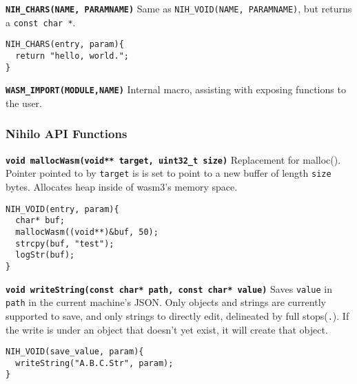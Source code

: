 \documentclass{article}
\begin{document}
\textbf{\texttt{NIH\_CHARS(NAME, PARAMNAME)}}\newline
Same as \texttt{NIH\_VOID(NAME, PARAMNAME)}, but returns a \texttt{const char *}.

\begin{tcolorbox}[colback=white,grow to left by=2.5mm,grow to right by=2.5mm,left*=0mm,right*=0mm,sharp corners]
\begin{verbatim}
NIH_CHARS(entry, param){
  return "hello, world.";
}
\end{verbatim}
\end{tcolorbox}

\textbf{\texttt{WASM\_IMPORT(MODULE,NAME)}}\newline
Internal macro, assisting with exposing functions to the user.

\subsubsection{Nihilo API Functions}

\textbf{\texttt{void mallocWasm(void** target, uint32\_t size)}}\newline
Replacement for malloc(). Pointer pointed to by \texttt{target} is is set to point to a new buffer of length \texttt{size} bytes. Allocates heap inside of wasm3's memory space.

\begin{tcolorbox}[colback=white,grow to left by=2.5mm,grow to right by=2.5mm,left*=0mm,right*=0mm,sharp corners]
\begin{verbatim}
NIH_VOID(entry, param){
  char* buf;
  mallocWasm((void**)&buf, 50);
  strcpy(buf, "test");
  logStr(buf);
}
\end{verbatim}
\end{tcolorbox}

\textbf{\texttt{void writeString(const char* path, const char* value)}}\newline
Saves \texttt{value} in \texttt{path} in the current machine's JSON. Only objects and strings are currently supported to save, and only strings to directly edit, delineated by full stops(\texttt{.}). If the write is under an object that doesn't yet exist, it will create that object.

\begin{tcolorbox}[colback=white,grow to left by=2.5mm,grow to right by=2.5mm,left*=0mm,right*=0mm,sharp corners]
\begin{verbatim}
NIH_VOID(save_value, param){
  writeString("A.B.C.Str", param);
}
\end{verbatim}
\end{tcolorbox}
\end{document}

